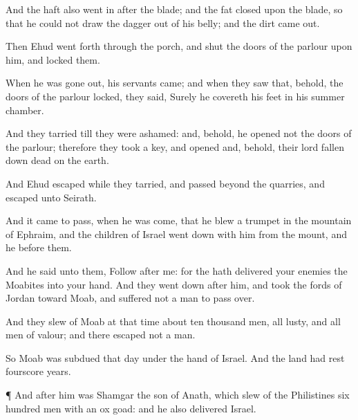 {And the
haft also went
in
after the
blade; and the
fat
closed
upon the
blade, so that he could not
draw the
dagger out of his
belly; and the
dirt came
out.

Then
Ehud went
forth through the
porch, and
shut the
doors of the
parlour upon him, and
locked them.

When he was gone
out, his
servants
came; and when they
saw that, behold, the
doors of the
parlour
{}
locked, they
said, Surely he
covereth his
feet in his
summer
chamber.

And they
tarried till they were
ashamed: and, behold, he
opened not the
doors of the
parlour; therefore they
took a
key, and
opened
{} and, behold, their
lord
{} fallen
down
dead on the
earth.

And
Ehud
escaped while they
tarried, and passed
beyond the
quarries, and
escaped unto
Seirath.

And it came to pass, when he was
come, that he
blew a
trumpet in the
mountain of
Ephraim, and the
children of
Israel went
down with him from the
mount, and he
before them.

And he
said unto them,
Follow
after me: for the
{} hath
delivered your
enemies the
Moabites into your
hand. And they went
down
after him, and
took the
fords of
Jordan toward
Moab, and
suffered not a
man to pass
over.

And they
slew of
Moab at that
time about
ten
thousand
men, all
lusty, and all
men of
valour; and there
escaped not a
man.

So
Moab was
subdued that
day under the
hand of
Israel. And the
land had
rest
fourscore
years.


\par }{\PP {}¶ And
after him was
Shamgar the
son of
Anath, which
slew of the
Philistines
six
hundred
men with an
ox
goad: and he also
delivered
Israel.




\par }
